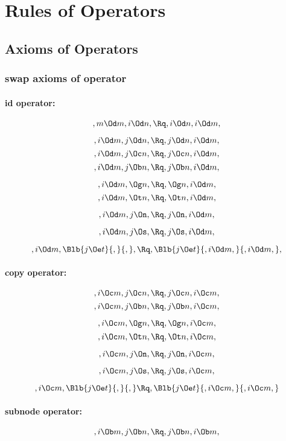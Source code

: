 
 \chapter{Rules of Operators}

\section{Axioms of Operators}

\subsection{swap axioms of operator}
\subsubsection{id operator:}
\[,m \Od m, i \Od n, \Rq ,i \Od n, i \Od m,\]

\[,i \Od m, j \Od n, \Rq ,j \Od n, i \Od m,\]
\[,i \Od m, j \Oc n, \Rq ,j \Oc n, i \Od m,\]
\[,i \Od m, j \Ob n, \Rq ,j \Ob n, i \Od m,\]

\[,i \Od m,  \Og n, \Rq , \Og n, i \Od m,\]
\[,i \Od m,  \Ot n, \Rq , \Ot n, i \Od m,\]

\[,i \Od m, j \On, \Rq , j \On, i \Od m,\]

\[,i \Od m, j \Os, \Rq , j \Os, i \Od m,\]

\[,i \Od m, \Blb{j \Oe t}{,}{,}, \Rq , \Blb{j \Oe t}{,i \Od m,}{,i \Od m,},\]





\bigskip
\subsubsection{copy operator:}
\[,i \Oc m, j \Oc n, \Rq ,j \Oc n, i \Oc m,\]
\[,i \Oc m, j \Ob n, \Rq ,j \Ob n, i \Oc m,\]

\[,i \Oc m,  \Og n, \Rq , \Og n, i \Oc m,\]
\[,i \Oc m,  \Ot n, \Rq , \Ot n, i \Oc m,\]

\[,i \Oc m, j \On, \Rq , j \On, i \Oc m,\]

\[,i \Oc m, j \Os, \Rq , j \Os, i \Oc m,\]

\[,i \Oc m, \Blb{j \Oe t}{,}{,} \Rq , \Blb{j \Oe t}{,i \Oc m,}{,i \Oc m,}\]



\bigskip
\subsubsection{subnode operator:}
\[,i \Ob m, j \Ob n, \Rq ,j \Ob n, i \Ob m,\]

